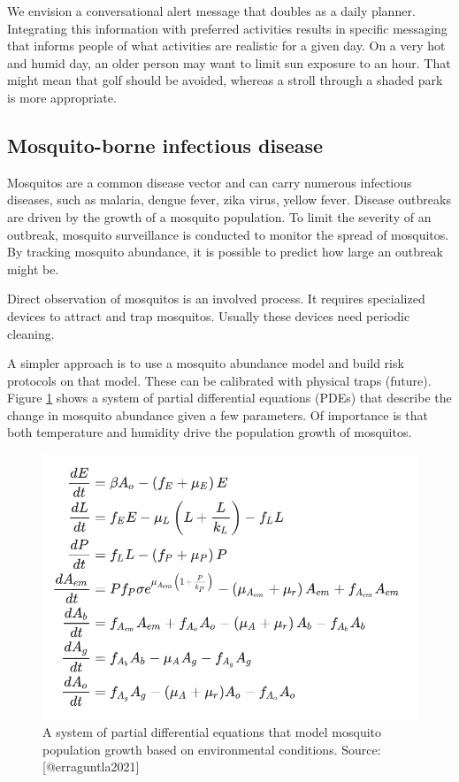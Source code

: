 \documentclass[
]{book}
\begin{document}
We envision a conversational alert message that doubles as a daily planner.
Integrating this information with preferred activities results in specific
messaging that informs people of what activities are realistic for a given
day. On a very hot and humid day, an older person may want to
limit sun exposure to an hour. That might mean that golf should be avoided,
whereas a stroll through a shaded park is more appropriate.

\hypertarget{mosquito-borne-infectious-disease}{%
\subsection{Mosquito-borne infectious disease}\label{mosquito-borne-infectious-disease}}

Mosquitos are a common disease vector and
can carry numerous infectious diseases,
such as malaria, dengue fever, zika virus, yellow fever.
Disease outbreaks are driven by the growth of a mosquito population.
To limit the severity of an outbreak,
mosquito surveillance is conducted to monitor the spread of mosquitos.
By tracking mosquito abundance, it is possible to predict how large an
outbreak might be.

Direct observation of mosquitos is an involved process.
It requires specialized devices to attract and trap mosquitos.
Usually these devices need periodic cleaning.

A simpler approach is to use a mosquito abundance model and
build risk protocols on that model.
These can be calibrated with physical traps (future).
Figure \ref{fig:mosquito-abundance-pdes} shows a system of
partial differential equations (PDEs) that describe the change
in mosquito abundance given a few parameters.
Of importance is that both temperature and humidity drive the
population growth of mosquitos.

\begin{figure}

{\centering \includegraphics[width=10.15in]{images/mosquito_abundance_pdes} 

}

\caption{A system of partial differential equations that model mosquito population growth based on environmental conditions. Source: [@erraguntla2021]}\label{fig:mosquito-abundance-pdes}
\end{figure}
\end{document}
